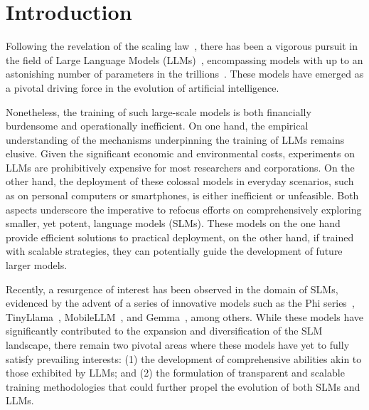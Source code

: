 \section{Introduction}

Following the revelation of the scaling law~\citep{kaplan2020scaling}, there has been a vigorous pursuit in the field of Large Language Models (LLMs)~\citep{hoffmann2022training, bai2023qwen, team2023gemini, chowdhery2023palm, achiam2023gpt}, encompassing models with up to an astonishing number of parameters in the trillions~\citep{fedus2022switch}. These models have emerged as a pivotal driving force in the evolution of artificial intelligence.

Nonetheless, the training of such large-scale models is both financially burdensome and operationally inefficient. On one hand, the empirical understanding of the mechanisms underpinning the training of LLMs remains elusive. Given the significant economic and environmental costs, experiments on LLMs are prohibitively expensive for most researchers and corporations. On the other hand, the deployment of these colossal models in everyday scenarios, such as on personal computers or smartphones, is either inefficient or unfeasible. Both aspects underscore the imperative to refocus efforts on comprehensively exploring smaller, yet potent, language models (SLMs). These models on the one hand provide efficient solutions to practical deployment, on the other hand, if trained with scalable strategies, they can potentially guide the development of future larger models.

Recently, a resurgence of interest has been observed in the domain of SLMs, evidenced by the advent of a series of innovative models such as the Phi series~\citep{gunasekar2023textbooks, li2023textbooks, Javaheripi2023Phi2}, TinyLlama~\citep{zhang2024tinyllama}, MobileLLM~\citep{liu2024mobilellm}, and Gemma~\citep{Banks2024Gemma}, among others. While these models have significantly contributed to the expansion and diversification of the SLM landscape, there remain two pivotal areas where these models have yet to fully satisfy prevailing interests: (1) the development of comprehensive abilities akin to those exhibited by LLMs; and (2) the formulation of transparent and scalable training methodologies that could further propel the evolution of both SLMs and LLMs.

